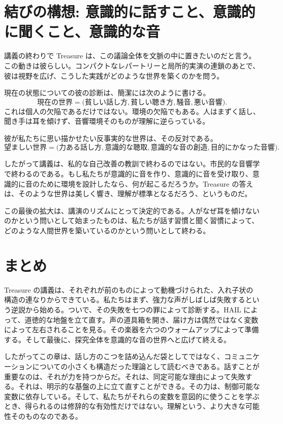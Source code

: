 \section{結びの構想: 意識的に話すこと、意識的に聞くこと、意識的な音}

講義の終わりで Treasure は、この議論全体を文脈の中に置きたいのだと言う。この動きは彼らしい。コンパクトなレパートリーと局所的実演の連鎖のあとで、彼は視野を広げ、こうした実践がどのような世界を築くのかを問う。

現在の状態についての彼の診断は、簡潔には次のように書ける。
\begin{equation}
\text{現在の世界}
=
\bigl(
\text{貧しい話し方},
\text{貧しい聴き方},
\text{騒音},
\text{悪い音響}
\bigr).
\end{equation}
これは個人の欠陥であるだけではない。環境の欠陥でもある。人はまずく話し、聞き手は耳を傾けず、音響環境そのものが理解に逆らっている。

彼が私たちに思い描かせたい反事実的な世界は、その反対である。
\begin{equation}
\text{望ましい世界}
=
\bigl(
\text{力ある話し方},
\text{意識的な聴取},
\text{意識的な音の創造},
\text{目的にかなった音響}
\bigr).
\end{equation}

したがって講義は、私的な自己改善の教訓で終わるのではない。市民的な音響学で終わるのである。もし私たちが意識的に音を作り、意識的に音を受け取り、意識的に音のために環境を設計したなら、何が起こるだろうか。Treasure の答えは、そのような世界は美しく響き、理解が標準となるだろう、というものだ。

この最後の拡大は、講演のリズムにとって決定的である。人がなぜ耳を傾けないのかという問いとして始まったものは、私たちが話す習慣と聞く習慣によって、どのような人間世界を築いているのかという問いとして終わる。

\section{まとめ}

Treasure の講義は、それぞれが前のものによって動機づけられた、入れ子状の構造の連なりからできている。私たちはまず、強力な声がしばしば失敗するという逆説から始める。ついで、その失敗を七つの罪によって診断する。HAIL によって、道徳的な地盤を立て直す。声の道具箱を開き、届け方は偶然ではなく変数によって左右されることを見る。その楽器を六つのウォームアップによって準備する。そして最後に、探究全体を意識的な音の世界へと広げて終える。

したがってこの章は、話し方のこつを詰め込んだ袋としてではなく、コミュニケーションについての小さくも構造だった理論として読むべきである。話すことが重要なのは、それが力を持つからだ。それは、同定可能な理由によって失敗する。それは、明示的な基盤の上に立て直すことができる。その力は、制御可能な変数に依存している。そして、私たちがそれらの変数を意図的に使うことを学ぶとき、得られるのは修辞的な有効性だけではない。理解という、より大きな可能性そのものなのである。